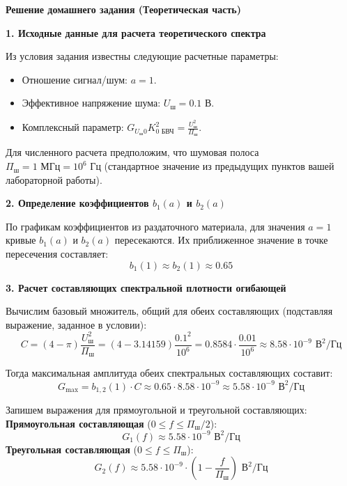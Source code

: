 \textbf{Решение домашнего задания (Теоретическая часть)}

\vspace{1em}
\textbf{1. Исходные данные для расчета теоретического спектра}

Из условия задания известны следующие расчетные параметры:
\begin{itemize}
    \item Отношение сигнал/шум: $a = 1$.
    \item Эффективное напряжение шума: $U_{\text{ш}} = 0.1 \text{ В}$.
    \item Комплексный параметр: $G_{U_{\text{ш}}0} K_{0\text{ БВЧ}}^2 = \frac{U_{\text{ш}}^2}{\Pi_{\text{ш}}}$.
\end{itemize}
Для численного расчета предположим, что шумовая полоса $\Pi_{\text{ш}} = 1 \text{ МГц} = 10^6 \text{ Гц}$ (стандартное значение из предыдущих пунктов вашей лабораторной работы).

\vspace{1em}
\textbf{2. Определение коэффициентов $b_1(a)$ и $b_2(a)$}

По графикам коэффициентов из раздаточного материала, для значения $a = 1$ кривые $b_1(a)$ и $b_2(a)$ пересекаются. Их приближенное значение в точке пересечения составляет:
\begin{equation*}
    b_1(1) \approx b_2(1) \approx 0.65
\end{equation*}

\vspace{1em}
\textbf{3. Расчет составляющих спектральной плотности огибающей}

Вычислим базовый множитель, общий для обеих составляющих (подставляя выражение, заданное в условии):
\begin{equation*}
    C = (4 - \pi) \frac{U_{\text{ш}}^2}{\Pi_{\text{ш}}} = (4 - 3.14159) \frac{0.1^2}{10^6} = 0.8584 \cdot \frac{0.01}{10^6} \approx 8.58 \cdot 10^{-9} \text{ В}^2/\text{Гц}
\end{equation*}

Тогда максимальная амплитуда обеих спектральных составляющих составит:
\begin{equation*}
    G_{\text{max}} = b_{1,2}(1) \cdot C \approx 0.65 \cdot 8.58 \cdot 10^{-9} \approx 5.58 \cdot 10^{-9} \text{ В}^2/\text{Гц}
\end{equation*}

Запишем выражения для прямоугольной и треугольной составляющих:
\textbf{Прямоугольная составляющая} ($0 \le f \le \Pi_{\text{ш}}/2$):
\begin{equation*}
    G_1(f) \approx 5.58 \cdot 10^{-9} \text{ В}^2/\text{Гц}
\end{equation*}
\textbf{Треугольная составляющая} ($0 \le f \le \Pi_{\text{ш}}$):
\begin{equation*}
    G_2(f) \approx 5.58 \cdot 10^{-9} \cdot \left(1 - \frac{f}{\Pi_{\text{ш}}}\right) \text{ В}^2/\text{Гц}
\end{equation*}

